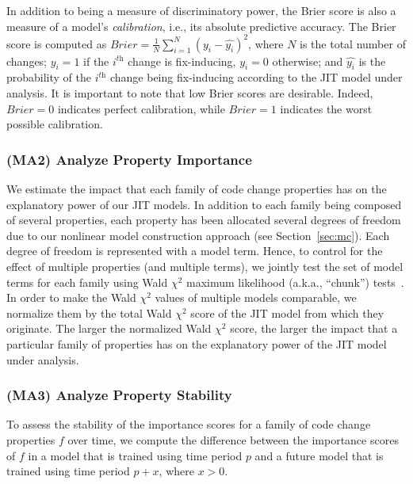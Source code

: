 In addition to being a measure of discriminatory power, the Brier score is also a measure of a model's {\em calibration}, i.e., its absolute predictive accuracy.
The Brier score is computed as $\textit{Brier} = \frac{1}{N}\sum_{i=1}^{N}(y_i - \hat{y_i})^2$, where $N$ is the total number of changes; $y_i=1$ if the $i^{\textit{th}}$ change is fix-inducing, $y_i=0$ otherwise; and $\hat{y_i}$ is the probability of the $i^{\textit{th}}$ change being fix-inducing according to the JIT model under analysis.
It is important to note that low Brier scores are desirable.
Indeed, $\textit{Brier} = 0$ indicates perfect calibration, while $\textit{Brier} = 1$ indicates the worst possible calibration.

\subsubsection*{(MA2) Analyze Property Importance}
We estimate the impact that each family of code change properties has on the explanatory power of our JIT models.
In addition to each family being composed of several properties, each property has been allocated several degrees of freedom due to our nonlinear model construction approach (see Section~\ref{sec:mc}).
Each degree of freedom is represented with a model term.
Hence, to control for the effect of multiple properties (and multiple terms), we jointly test the set of model terms for each family using Wald $\chi^2$ maximum likelihood (a.k.a., ``chunk'') tests~\cite{frank}.
In order to make the Wald $\chi^2$ values of multiple models comparable, we normalize them by the total Wald $\chi^2$ score of the JIT model from which they originate.
The larger the normalized Wald $\chi^2$ score, the larger the impact that a particular family of properties has on the explanatory power of the JIT model under analysis.

\subsubsection*{(MA3) Analyze Property Stability}
To assess the stability of the importance scores for a family of code change properties $f$ over time, we compute the difference between the importance scores of $f$ in a model that is trained using time period $p$ and a future model that is trained using time period $p+x$, where $x>0$.
